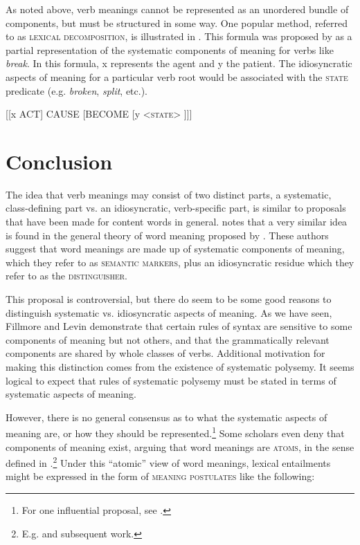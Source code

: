 As noted above, verb meanings cannot be represented as an unordered bundle of components, but must be structured in some way. One popular method, referred to as \textsc{lexical decomposition}, is illustrated in . This formula was proposed by   \citet[109]{RappaportHovavLevin1998} as a partial representation of the systematic components of meaning for verbs like \textit{break}. In this formula, x represents the agent and y the patient. The idiosyncratic aspects of meaning for a particular verb root would be associated with the \textsc{state} predicate (e.g. \textit{broken}, \textit{split}, etc.).


\ea \label{ex:7.33}
{}[[x ACT] CAUSE [BECOME [y <\textsc{state}> ]]]
\z

\section{Conclusion}\label{sec:7.6}

The idea that verb meanings may consist of two distinct parts, a systematic, class-defining part vs. an idiosyncratic, verb-specific part, is similar to proposals that have been made for content words in general. \citet[131]{Fillmore1970} notes that a very similar idea is found in the general theory of word meaning proposed by \citet{KatzFodor1963}. These authors suggest that word meanings are made up of systematic components of meaning, which they refer to as \textsc{semantic markers}, plus an idiosyncratic residue which they refer to as the \textsc{distinguisher}.



This proposal is controversial, but there do seem to be some good reasons to distinguish systematic vs. idiosyncratic aspects of meaning. As we have seen, Fillmore and Levin demonstrate that certain rules of syntax are sensitive to some components of meaning but not others, and that the grammatically relevant components are shared by whole classes of verbs. Additional motivation for making this distinction comes from the existence of systematic polysemy. It seems logical to expect that rules of systematic polysemy must be stated in terms of systematic aspects of meaning.



However, there is no general consensus as to what the systematic aspects of meaning are, or how they should be represented.\footnote{For one influential proposal, see \citet{Pustejovsky1995}.} Some scholars even deny that components of meaning exist, arguing that word meanings are \textsc{atoms}, in the sense defined in .\footnote{E.g. \citet{Fodor1975} and subsequent work.} Under this “atomic” view of word meanings, lexical entailments might be expressed in the form of \textsc{meaning postulates} like the following:


